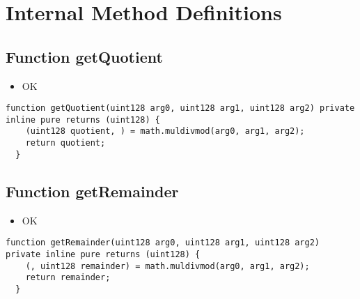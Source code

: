 \section{Internal Method Definitions}


\subsection{Function getQuotient}

\begin{itemize}
\item OK
\end{itemize}

\begin{lstlisting}[firstnumber=48]
  function getQuotient(uint128 arg0, uint128 arg1, uint128 arg2) private inline pure returns (uint128) {
    (uint128 quotient, ) = math.muldivmod(arg0, arg1, arg2);
    return quotient;
  }
\end{lstlisting}

\subsection{Function getRemainder}

\begin{itemize}
\item OK
\end{itemize}

\begin{lstlisting}[firstnumber=54]
  function getRemainder(uint128 arg0, uint128 arg1, uint128 arg2) private inline pure returns (uint128) {
    (, uint128 remainder) = math.muldivmod(arg0, arg1, arg2);
    return remainder;
  }
\end{lstlisting}
